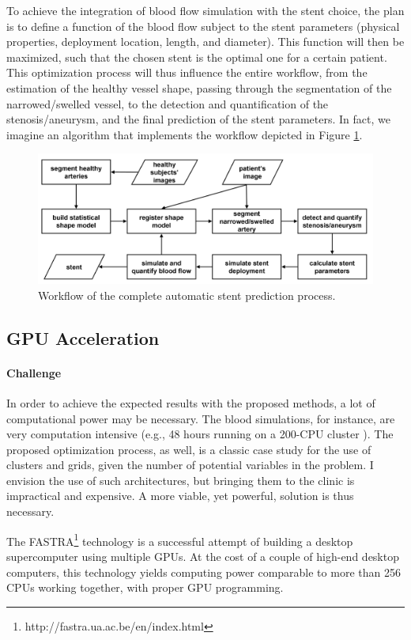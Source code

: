 \documentclass[a4paper]{article}
\newcommand{\challenge}{\paragraph{Challenge}}
\newcommand{\citep}{\cite}
\begin{document}
To achieve the integration of blood flow simulation with the stent choice, the plan is to define a function of the blood flow subject to the stent parameters (physical properties, deployment location, length, and diameter). This function will then be maximized, such that the chosen stent is the optimal one for a certain patient. This optimization process will thus influence the entire workflow, from the estimation of the healthy vessel shape, passing through the segmentation of the narrowed/swelled vessel, to the detection and quantification of the stenosis/aneurysm, and the final prediction of the stent parameters. In fact, we imagine an algorithm that implements the workflow depicted in Figure \ref{fig:workflow}. 

\begin{figure}%
\centering
\includegraphics[width=0.8\columnwidth]{workflow.png}%
\caption{Workflow of the complete automatic stent prediction process.}%
\label{fig:workflow}%
\end{figure}

\subsection{GPU Acceleration}

\challenge
In order to achieve the expected results with the proposed methods, a lot of computational power may be necessary. The blood simulations, for instance, are very computation intensive (e.g., 48 hours running on a 200-CPU cluster \citep{deBeule}). The proposed optimization process, as well, is a classic case study for the use of clusters and grids, given the number of potential variables in the problem. I envision the use of such architectures, but bringing them to the clinic is impractical and expensive. A more viable, yet powerful, solution is thus necessary.

The FASTRA\footnote{http://fastra.ua.ac.be/en/index.html} technology is a successful attempt of building a desktop supercomputer using multiple GPUs. At the cost of a couple of high-end desktop computers, this technology yields computing power comparable to more than 256 CPUs working together, with proper GPU programming.
\end{document}
